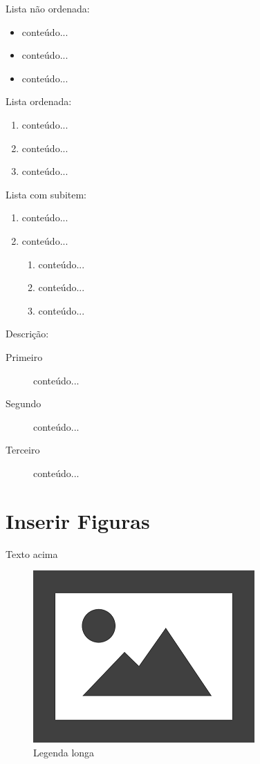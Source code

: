 \documentclass[12pt]{article}
\begin{document}
Lista não ordenada:

\begin{itemize}
	\item conteúdo...
	\item conteúdo...
	\item conteúdo...
\end{itemize}

Lista ordenada:
\begin{enumerate}
	\item conteúdo...
	\item conteúdo...
	\item conteúdo...
\end{enumerate}

Lista com subitem:
\begin{enumerate}
	\item conteúdo...
	\item conteúdo...
	\begin{enumerate}
		\item conteúdo...
		\item conteúdo...
		\item conteúdo...
	\end{enumerate}
\end{enumerate}

Descrição:
\begin{description}
	\item[Primeiro] conteúdo...
	\item[Segundo] conteúdo...
	\item[Terceiro] conteúdo...
\end{description}

\newpage
\section{Inserir Figuras}

Texto acima

\begin{figure}[H]
	\centering
	\includegraphics[width=0.7\linewidth]{Figuras/fig3}
	\caption[Legenda curta]{Legenda longa}
	\label{fig:figura genérica}
\end{figure}
	
\end{document}
